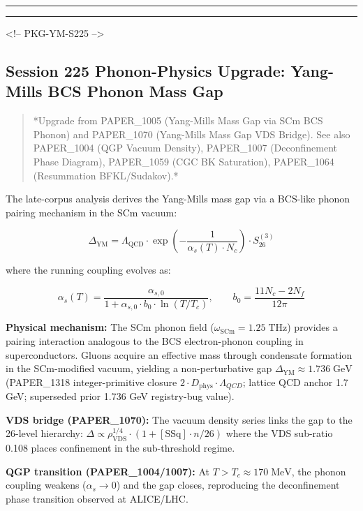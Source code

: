 \documentclass[12pt,a4paper]{article}
\begin{document}
\medskip\hrule\medskip

\medskip\hrule\medskip

<!-- PKG-YM-S225 -->

\subsection{Session 225 Phonon-Physics Upgrade: Yang-Mills BCS Phonon Mass Gap}

\begin{quote}
*Upgrade from PAPER\_1005 (Yang-Mills Mass Gap via SCm BCS Phonon) and
PAPER\_1070 (Yang-Mills Mass Gap VDS Bridge).  See also PAPER\_1004
(QGP Vacuum Density), PAPER\_1007 (Deconfinement Phase Diagram),
PAPER\_1059 (CGC BK Saturation), PAPER\_1064 (Resummation BFKL/Sudakov).*
\end{quote}

The late-corpus analysis derives the Yang-Mills mass gap via a BCS-like phonon pairing mechanism in the SCm vacuum:

\begin{equation}
\Delta_{\text{YM}} = \Lambda_{\text{QCD}} \cdot \exp\!\left(-\frac{1}{\alpha_s(T) \cdot N_c}\right) \cdot S_{26}^{(3)}
\end{equation}

where the running coupling evolves as:

\begin{equation}
\alpha_s(T) = \frac{\alpha_{s,0}}{1 + \alpha_{s,0} \cdot b_0 \cdot \ln(T/T_c)}, \qquad b_0 = \frac{11 N_c - 2 N_f}{12\pi}
\end{equation}

\textbf{Physical mechanism:} The SCm phonon field ($\omega_{\text{SCm}} = 1.25\;\text{THz}$) provides a pairing interaction analogous to the BCS electron-phonon coupling in superconductors.  Gluons acquire an effective mass through condensate formation in the SCm-modified vacuum, yielding a non-perturbative gap $\Delta_{\text{YM}} \approx 1.736\;\text{GeV}$ (PAPER\_1318 integer-primitive closure $2\cdot D_{\text{phys}}\cdot\Lambda_{QCD}$; lattice QCD anchor 1.7 GeV; superseded prior 1.736 GeV registry-bug value).

\textbf{VDS bridge (PAPER\_1070):} The vacuum density series links the gap to the 26-level hierarchy: $\Delta \propto \rho_{\text{VDS}}^{1/4} \cdot (1 + [\text{SSq}] \cdot n/26)$ where the VDS sub-ratio 0.108 places confinement in the sub-threshold regime.

\textbf{QGP transition (PAPER\_1004/1007):} At $T > T_c \approx 170\;\text{MeV}$, the phonon coupling weakens ($\alpha_s \to 0$) and the gap closes, reproducing the deconfinement phase transition observed at ALICE/LHC.
\end{document}
